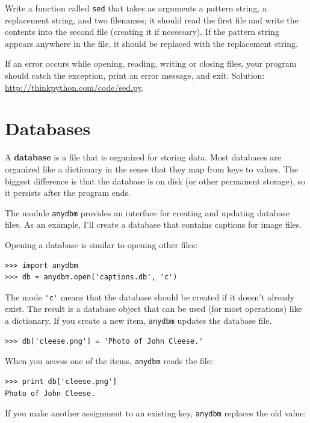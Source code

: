 \documentclass[10pt]{book}
\begin{document}
\begin{exercise}

Write a function called {\tt sed} that takes as arguments a pattern string,
a replacement string, and two filenames; it should read the first file
and write the contents into the second file (creating it if
necessary).  If the pattern string appears anywhere in the file, it
should be replaced with the replacement string.

If an error occurs while opening, reading, writing or closing files,
your program should catch the exception, print an error message, and
exit.  Solution: \url{http://thinkpython.com/code/sed.py}.

\end{exercise}


\section{Databases}

A {\bf database} is a file that is organized for storing data.
Most databases are organized like a dictionary in the sense
that they map from keys to values.  The biggest difference
is that the database is on disk (or other permanent storage),
so it persists after the program ends.

The module {\tt anydbm} provides an interface for creating
and updating database files.  As an example, I'll create a database
that contains captions for image files.

Opening a database is similar to opening other files:

\begin{verbatim}
>>> import anydbm
>>> db = anydbm.open('captions.db', 'c')
\end{verbatim}
%
The mode \verb"'c'" means that the database should be created if
it doesn't already exist.  The result is a database object
that can be used (for most operations) like a dictionary.
If you create a new item, {\tt anydbm} updates the database file.


\begin{verbatim}
>>> db['cleese.png'] = 'Photo of John Cleese.'
\end{verbatim}
%
When you access one of the items, {\tt anydbm} reads the file:

\begin{verbatim}
>>> print db['cleese.png']
Photo of John Cleese.
\end{verbatim}
%
If you make another assignment to an existing key, {\tt anydbm} replaces
the old value:
\end{document}
